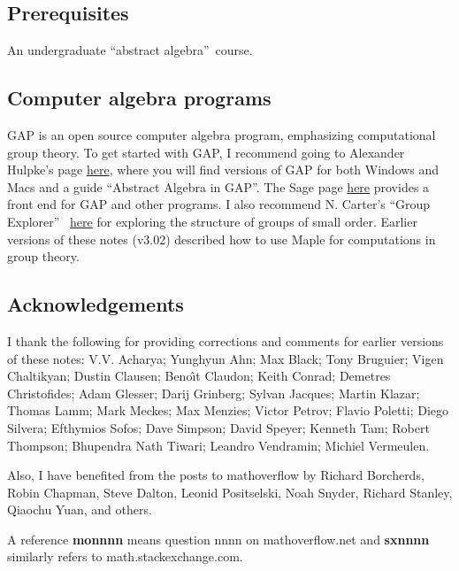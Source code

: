 \documentclass[a4paper,11pt,final,openany]{memoir}%
\theoremstyle{nonumberplain}
\begin{document}
\subsection{Prerequisites}

An undergraduate \textquotedblleft abstract algebra\textquotedblright\ course.

\subsection{Computer algebra programs}

GAP is an open source computer algebra program, emphasizing computational
group theory. To get started with GAP, I recommend going to Alexander Hulpke's
page \href{http://www.math.colostate.edu/~hulpke/CGT/education.html}{here},
where you will find versions of GAP for both Windows and Macs and a guide
\textquotedblleft Abstract Algebra in GAP\textquotedblright. The Sage page
\href{http://www.sagemath.org/}{here} provides a front end for GAP and other
programs. I also recommend N. Carter's \textquotedblleft Group
Explorer\textquotedblright%
\ \href{https://nathancarter.github.io/group-explorer/index.html}{here} for
exploring the structure of groups of small order. Earlier versions of these
notes (v3.02) described how to use Maple for computations in group theory.

\subsection{Acknowledgements}

\bsmall
I thank the following for providing corrections and comments for earlier
versions of these notes: V.V. Acharya; Yunghyun Ahn; Max Black; Tony Bruguier; Vigen
Chaltikyan; Dustin Clausen; Beno\^{\i}t Claudon; Keith Conrad; Demetres
Christofides; Adam Glesser; Darij Grinberg; Sylvan Jacques; Martin Klazar;
Thomas Lamm; Mark Meckes; Max Menzies; Victor Petrov; Flavio Poletti; Diego Silvera;
Efthymios Sofos; Dave Simpson; David Speyer; Kenneth Tam; Robert Thompson;
Bhupendra Nath Tiwari; Leandro Vendramin; Michiel Vermeulen.

Also, I have benefited from the posts to mathoverflow by Richard Borcherds,
Robin Chapman, Steve Dalton, Leonid Positselski, Noah Snyder, Richard Stanley,
Qiaochu Yuan, and others.

A reference \textbf{monnnn} means question nnnn on mathoverflow.net and
\textbf{sxnnnn} similarly refers to math.stackexchange.com. \esmall
\end{document}
